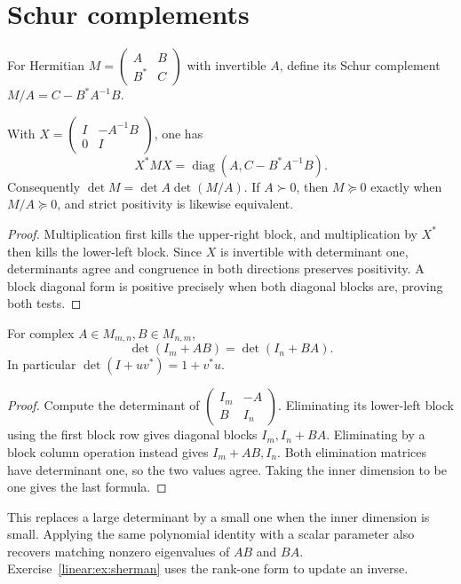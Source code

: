 \section{Schur complements}

For Hermitian $M=\begin{pmatrix}A&B\\B^*&C\end{pmatrix}$ with invertible $A$, define its Schur complement $M/A=C-B^*A^{-1}B$.
\begin{proposition}\label{linear:prop:schurcomplement}
With $X=\begin{pmatrix}I&-A^{-1}B\\0&I\end{pmatrix}$, one has
\[X^*MX=\operatorname{diag}(A,C-B^*A^{-1}B).
\]
Consequently $\det M=\det A\det(M/A)$. If $A\succ0$, then $M\succeq0$ exactly when $M/A\succeq0$, and strict positivity is likewise equivalent.
\end{proposition}
\begin{proof}
Multiplication first kills the upper-right block, and multiplication by $X^*$ then kills the lower-left block. Since $X$ is invertible with determinant one, determinants agree and congruence in both directions preserves positivity. A block diagonal form is positive precisely when both diagonal blocks are, proving both tests.
\end{proof}

\begin{proposition}\label{linear:prop:detIAB}
For complex $A\in M_{m,n},B\in M_{n,m}$,
\[\det(I_m+AB)=\det(I_n+BA).
\]
In particular $\det(I+uv^*)=1+v^*u$.
\end{proposition}
\begin{proof}
Compute the determinant of $\begin{pmatrix}I_m&-A\\B&I_n\end{pmatrix}$. Eliminating its lower-left block using the first block row gives diagonal blocks $I_m,I_n+BA$. Eliminating by a block column operation instead gives $I_m+AB,I_n$. Both elimination matrices have determinant one, so the two values agree. Taking the inner dimension to be one gives the last formula.
\end{proof}

This replaces a large determinant by a small one when the inner dimension is small. Applying the same polynomial identity with a scalar parameter also recovers matching nonzero eigenvalues of $AB$ and $BA$. Exercise~\ref{linear:ex:sherman} uses the rank-one form to update an inverse.

